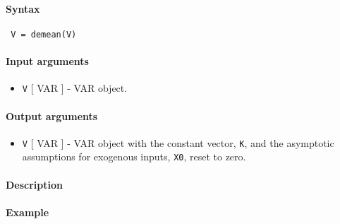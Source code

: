 


	\paragraph{Syntax}
 
 \begin{verbatim}
 V = demean(V)
 \end{verbatim}
 
 \paragraph{Input arguments}
 
 \begin{itemize}
 \item
   \texttt{V} {[} VAR {]} - VAR object.
 \end{itemize}
 
 \paragraph{Output arguments}
 
 \begin{itemize}
 \item
   \texttt{V} {[} VAR {]} - VAR object with the constant vector,
   \texttt{K}, and the asymptotic assumptions for exogenous inputs,
   \texttt{X0}, reset to zero.
 \end{itemize}
 
 \paragraph{Description}
 
 \paragraph{Example}


